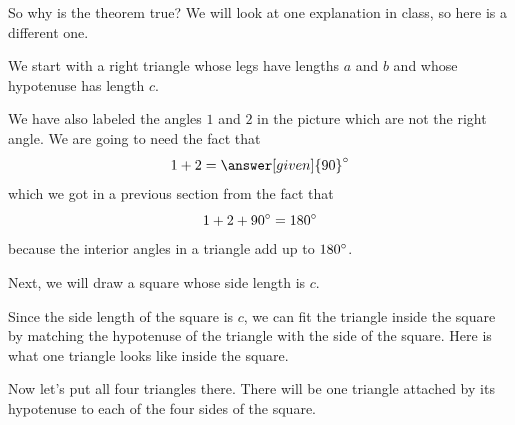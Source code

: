 \documentclass{ximera}
\begin{document}
So why is the theorem true? We will look at one explanation in class, so here is a different one.
\begin{explanation}
We start with a right triangle whose legs have lengths $a$ and $b$ and whose hypotenuse has length $c$.
\begin{image}
\end{image}
We have also labeled the angles $1$ and $2$ in the picture which are not the right angle. We are going to need the fact that
\[
1 + 2 = \answer[given]{90}\degree
\]
which we got in a previous section from the fact that
\[
1 + 2 + 90\degree = 180\degree
\]
because the interior angles in a triangle add up to $180\degree$.

Next, we will draw a square whose side length is $c$.
\begin{image}
\end{image}
Since the side length of the square is $c$, we can fit the triangle inside the square by matching the hypotenuse of the triangle with the side of the square. Here is what one triangle looks like inside the square.
\begin{image}
\end{image}
Now let's put all four triangles there. There will be one triangle attached by its hypotenuse to each of the four sides of the square.
\begin{image}
\end{image}
\end{explanation}
\end{document}
